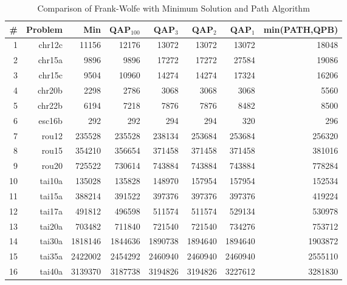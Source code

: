 \documentclass{article} %
\begin{document}
\begin{table}[h!]
\caption{Comparison of Frank-Wolfe with Minimum Solution and Path Algorithm}
\begin{center}
\begin{tabular}{|r|r|r||r|r|r|r|r|}
\hline
\# & Problem  &   Min    & QAP$_{100}$ & QAP$_{3}$ & QAP$_{2}$ & QAP$_{1}$& min(PATH,QPB)\\
\hline
1&    chr12c &   11156 &   12176 &   13072 &   13072 &   13072 &   18048\\
2&    chr15a &    9896 &    9896 &   17272 &   17272 &   27584 &   19086\\
3&    chr15c &    9504 &   10960 &   14274 &   14274 &   17324 &   16206\\
4&   chr20b &    2298 &    2786 &    3068 &    3068 &    3068 &    5560\\
5&    chr22b &    6194 &    7218 &    7876 &    7876 &    8482 &    8500\\
6&    esc16b &     292 &     292 &     294 &     294 &     320 &     296\\
7&     rou12 &  235528 &  235528 &  238134 &  253684 &  253684 &  256320\\
8&     rou15 &  354210 &  356654 &  371458 &  371458 &  371458 &  381016\\
9&     rou20 &  725522 &  730614 &  743884 &  743884 &  743884 &  778284\\
10&    tai10a &  135028 &  135828 &  148970 &  157954 &  157954 &  152534\\
11&    tai15a &  388214 &  391522 &  397376 &  397376 &  397376 &  419224\\
12&    tai17a &  491812 &  496598 &  511574 &  511574 &  529134 &  530978\\
13&    tai20a &  703482 &  711840 &  721540 &  721540 &  734276 &  753712\\
14&    tai30a & 1818146 & 1844636 & 1890738 & 1894640 & 1894640 & 1903872\\
15&    tai35a & 2422002 & 2454292 & 2460940 & 2460940 & 2460940 & 2555110\\
16&    tai40a & 3139370 & 3187738 & 3194826 & 3194826 & 3227612 & 3281830\\
    \hline
\end{tabular}
\end{center}
\label{tab:fwpath}
\end{table}%
\end{document}
